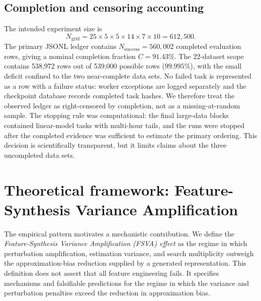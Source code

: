 \documentclass[preprint,12pt]{elsarticle}
\begin{document}
\subsection{Completion and censoring accounting}
The intended experiment size is
\begin{equation}
  N_{\mathrm{grid}}=25\times5\times5\times14\times7\times10=612{,}500.
\end{equation}
The primary JSONL ledger contains $N_{\mathrm{success}}=560{,}002$ completed evaluation rows, giving a nominal completion fraction $C=91.43\%$.  The 22-dataset scope contains 538,972 rows out of 539,000 possible rows ($99.995\%$), with the small deficit confined to the two near-complete data sets.  No failed task is represented as a row with a failure status: worker exceptions are logged separately and the checkpoint database records completed task hashes.  We therefore treat the observed ledger as right-censored by completion, not as a missing-at-random sample.  The stopping rule was computational: the final large-data blocks contained linear-model tasks with multi-hour tails, and the runs were stopped after the completed evidence was sufficient to estimate the primary ordering.  This decision is scientifically transparent, but it limits claims about the three uncompleted data sets.

\section{Theoretical framework: Feature-Synthesis Variance Amplification}
\label{sec:theory}

The empirical pattern motivates a mechanistic contribution.  We define the \emph{Feature-Synthesis Variance Amplification (FSVA) effect} as the regime in which perturbation amplification, estimation variance, and search multiplicity outweigh the approximation-bias reduction supplied by a generated representation.  This definition does not assert that all feature engineering fails.  It specifies mechanisms and falsifiable predictions for the regime in which the variance and perturbation penalties exceed the reduction in approximation bias.
\end{document}
